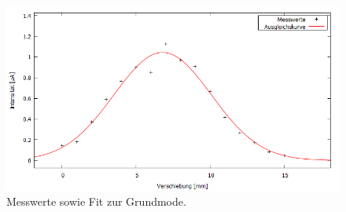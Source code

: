 \begin{figure}[H]
  \centering
  \includegraphics[width=14cm]{bilder/Grundmode.png}
  \caption{Messwerte sowie Fit zur Grundmode.}
  \label{mode1fit}
\end{figure}

